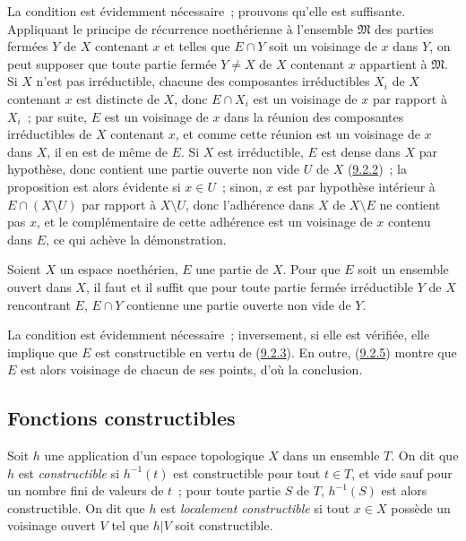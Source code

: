 La condition est évidemment nécessaire~; prouvons qu'elle est suffisante.
Appliquant le principe de récurrence noethérienne à l'ensemble $\mathfrak{M}$
des parties fermées $Y$ de $X$ contenant $x$ et telles que $E\cap Y$ soit un
voisinage de $x$ dans $Y$, on peut supposer que toute partie fermée $Y\ne X$
de $X$ contenant $x$ appartient à $\mathfrak{M}$. Si $X$ n'est pas
irréductible, chacune des composantes irréductibles $X_i$ de $X$ contenant
$x$ est distincte de $X$, donc $E\cap X_i$ est un voisinage de $x$ par
rapport à $X_i$~; par suite, $E$ est un voisinage de $x$ dans la réunion des
composantes irréductibles de $X$ contenant $x$, et comme cette réunion est un
voisinage de $x$ dans $X$, il en est de même de $E$. Si $X$ est
irréductible, $E$ est dense dans $X$ par hypothèse, donc contient une partie
ouverte non vide $U$ de $X$ (\hyperref[0.9.2.2-fr]{9.2.2})~; la proposition
est alors évidente si $x\in U$~; sinon, $x$ est par hypothèse intérieur à
$E\cap(X\setminus U)$ par rapport à $X\setminus U$, donc l'adhérence dans
$X$ de $X\setminus E$ ne contient pas $x$, et le complémentaire de cette
adhérence est un voisinage de $x$ contenu dans $E$, ce qui achève la
démonstration.

\begin{corollary}[9.2.6]
\label{0.9.2.6-fr}
Soient $X$ un espace noethérien, $E$ une partie de $X$. Pour que $E$ soit un
ensemble ouvert dans $X$, il faut et il suffit que pour toute partie fermée
irréductible $Y$ de $X$ rencontrant $E$, $E\cap Y$ contienne une partie
ouverte non vide de $Y$.
\end{corollary}

La condition est évidemment nécessaire~; inversement, si elle est vérifiée,
elle implique que $E$ est constructible en vertu de
(\hyperref[0.9.2.3-fr]{9.2.3}). En outre,
(\hyperref[0.9.2.5-fr]{9.2.5}) montre que $E$ est alors voisinage de chacun
de ses points, d'où la conclusion.

\subsection{Fonctions constructibles}
\label{subsection:0.9.3-fr}

\begin{definition}[9.3.1]
\label{0.9.3.1-fr}
Soit $h$ une application d'un espace topologique $X$ dans un ensemble $T$.
On dit que $h$ est \emph{constructible} si $h^{-1}(t)$ est constructible pour
tout $t\in T$, et vide sauf pour un nombre fini de valeurs de $t$~; pour
toute partie $S$ de $T$, $h^{-1}(S)$ est alors constructible. On dit que $h$
est \emph{localement constructible} si tout $x\in X$ possède un voisinage
ouvert $V$ tel que $h|V$ soit constructible.
\end{definition}

